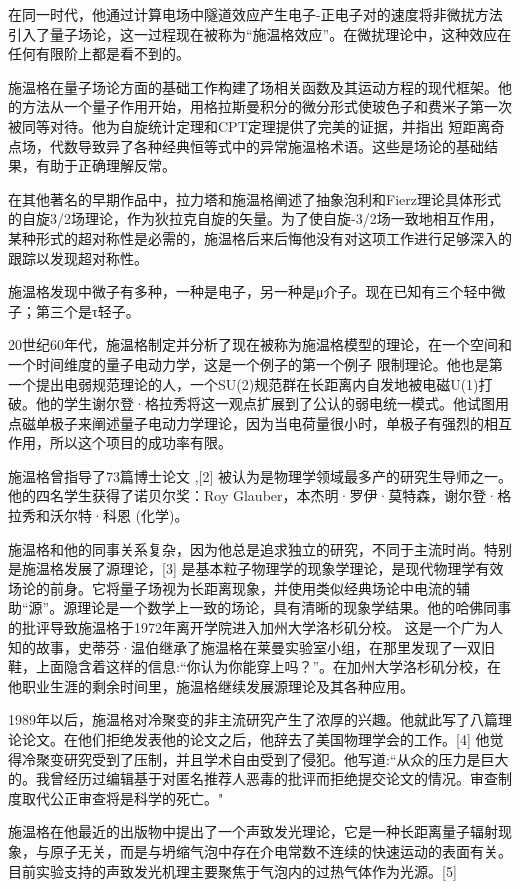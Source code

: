 在同一时代，他通过计算电场中隧道效应产生电子-正电子对的速度将非微扰方法引入了量子场论，这一过程现在被称为“施温格效应”。在微扰理论中，这种效应在任何有限阶上都是看不到的。

施温格在量子场论方面的基础工作构建了场相关函数及其运动方程的现代框架。他的方法从一个量子作用开始，用格拉斯曼积分的微分形式使玻色子和费米子第一次被同等对待。他为自旋统计定理和CPT定理提供了完美的证据，并指出 短距离奇点场，代数导致异了各种经典恒等式中的异常施温格术语。这些是场论的基础结果，有助于正确理解反常。

在其他著名的早期作品中，拉力塔和施温格阐述了抽象泡利和Fierz理论具体形式的自旋3/2场理论，作为狄拉克自旋的矢量。为了使自旋-3/2场一致地相互作用，某种形式的超对称性是必需的，施温格后来后悔他没有对这项工作进行足够深入的跟踪以发现超对称性。

施温格发现中微子有多种，一种是电子，另一种是μ介子。现在已知有三个轻中微子；第三个是τ轻子。

20世纪60年代，施温格制定并分析了现在被称为施温格模型的理论，在一个空间和一个时间维度的量子电动力学，这是一个例子的第一个例子 限制理论。他也是第一个提出电弱规范理论的人，一个SU(2)规范群在长距离内自发地被电磁U(1)打破。他的学生谢尔登·格拉秀将这一观点扩展到了公认的弱电统一模式。他试图用点磁单极子来阐述量子电动力学理论，因为当电荷量很小时，单极子有强烈的相互作用，所以这个项目的成功率有限。

施温格曾指导了73篇博士论文 ,[2] 被认为是物理学领域最多产的研究生导师之一。他的四名学生获得了诺贝尔奖：Roy Glauber，本杰明·罗伊·莫特森，谢尔登·格拉秀和沃尔特·科恩 (化学)。

施温格和他的同事关系复杂，因为他总是追求独立的研究，不同于主流时尚。特别是施温格发展了源理论，[3] 是基本粒子物理学的现象学理论，是现代物理学有效场论的前身。它将量子场视为长距离现象，并使用类似经典场论中电流的辅助“源”。源理论是一个数学上一致的场论，具有清晰的现象学结果。他的哈佛同事的批评导致施温格于1972年离开学院进入加州大学洛杉矶分校。 这是一个广为人知的故事，史蒂芬·温伯继承了施温格在莱曼实验室小组，在那里发现了一双旧鞋，上面隐含着这样的信息:“你认为你能穿上吗？”。在加州大学洛杉矶分校，在他职业生涯的剩余时间里，施温格继续发展源理论及其各种应用。

1989年以后，施温格对冷聚变的非主流研究产生了浓厚的兴趣。他就此写了八篇理论论文。在他们拒绝发表他的论文之后，他辞去了美国物理学会的工作。[4] 他觉得冷聚变研究受到了压制，并且学术自由受到了侵犯。他写道:“从众的压力是巨大的。我曾经历过编辑基于对匿名推荐人恶毒的批评而拒绝提交论文的情况。审查制度取代公正审查将是科学的死亡。"

施温格在他最近的出版物中提出了一个声致发光理论，它是一种长距离量子辐射现象，与原子无关，而是与坍缩气泡中存在介电常数不连续的快速运动的表面有关。目前实验支持的声致发光机理主要聚焦于气泡内的过热气体作为光源。[5]

